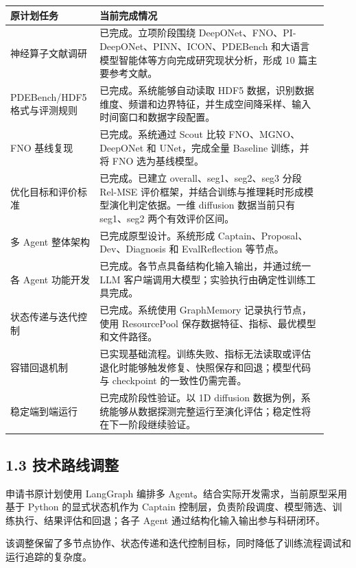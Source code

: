 \documentclass[UTF8,a4paper,zihao=-4]{ctexart}
\begin{document}
\begin{longtable}{|>{\raggedright\arraybackslash}p{0.23\linewidth}|>{\raggedright\arraybackslash}p{0.69\linewidth}|}
\hline
\textbf{原计划任务} & \textbf{当前完成情况} \\
\hline
神经算子文献调研 & 已完成。立项阶段围绕 DeepONet、FNO、PI-DeepONet、PINN、ICON、PDEBench 和大语言模型智能体等方向完成研究现状分析，形成 10 篇主要参考文献。 \\
\hline
PDEBench/HDF5 格式与评测规则 & 已完成。系统能够自动读取 HDF5 数据，识别数据维度、频谱和边界特征，并生成空间降采样、输入时间窗口和数据字段配置。 \\
\hline
FNO 基线复现 & 已完成。系统通过 Scout 比较 FNO、MGNO、DeepONet 和 UNet，完成全量 Baseline 训练，并将 FNO 选为基线模型。 \\
\hline
优化目标和评价标准 & 已完成。已建立 overall、seg1、seg2、seg3 分段 Rel-MSE 评价框架，并结合训练与推理耗时形成模型演化判定依据。一维 diffusion 数据当前只有 seg1、seg2 两个有效评价区间。 \\
\hline
多 Agent 整体架构 & 已完成原型设计。系统形成 Captain、Proposal、Dev、Diagnosis 和 EvalReflection 等节点。 \\
\hline
各 Agent 功能开发 & 已完成。各节点具备结构化输入输出，并通过统一 LLM 客户端调用大模型；实验执行由确定性训练工具完成。 \\
\hline
状态传递与迭代控制 & 已完成。系统使用 GraphMemory 记录执行节点，使用 ResourcePool 保存数据特征、指标、最优模型和文件路径。 \\
\hline
容错回退机制 & 已实现基础流程。训练失败、指标无法读取或评估退化时能够触发修复、快照保存和回退；模型代码与 checkpoint 的一致性仍需完善。 \\
\hline
稳定端到端运行 & 已完成阶段性验证。以 1D diffusion 数据为例，系统能够从数据探测完整运行至演化评估；稳定性将在下一阶段继续验证。 \\
\hline
\end{longtable}

\subsection*{1.3 技术路线调整}

申请书原计划使用 LangGraph 编排多 Agent。结合实际开发需求，当前原型采用基于 Python 的显式状态机作为 Captain 控制层，负责阶段调度、模型筛选、训练执行、结果评估和回退；各子 Agent 通过结构化输入输出参与科研闭环。

该调整保留了多节点协作、状态传递和迭代控制目标，同时降低了训练流程调试和运行追踪的复杂度。
\end{document}
